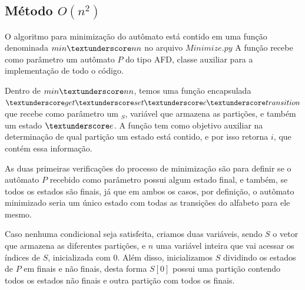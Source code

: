 \documentclass[12pt]{article}
\begin{document}
\subsection{Método $O(n^2)$}
O algoritmo para minimização do autômato está contido em uma função denominada $min\textunderscore nn$ no 
arquivo $Minimize.py$ A função recebe como parâmetro um autômato $P$ do tipo AFD, classe 
auxiliar para a implementação de todo o código. 

Dentro de $min\textunderscore nn$, temos uma função encapsulada $\textunderscore get\textunderscore set\textunderscore c\textunderscore transition$ que recebe como 
parâmetro um $_S$, variável que armazena as partições, e também um estado $\textunderscore e$. A função tem 
como objetivo auxiliar na determinação de qual partição um estado está contido, e por 
isso retorna $i$, que contém essa informação. 

As duas primeiras verificações do processo de minimização são para definir se o autômato 
$P$ recebido como parâmetro possui algum estado final, e também, se todos os estados são 
finais, já que em ambos os casos, por definição, o autômato minimizado seria um único 
estado com todas as transições do alfabeto para ele mesmo. 

Caso nenhuma condicional seja satisfeita, criamos duas variáveis, sendo $S$ o vetor que 
armazena as diferentes partições, e $n$ uma variável inteira que vai acessar os índices de 
$S$, inicializada com 0. Além disso, inicializamos $S$ dividindo os estados de $P$ em finais e 
não finais, desta forma $S[0]$ possui uma partição contendo todos os estados não finais e 
outra partição com todos os finais. 
\end{document}
